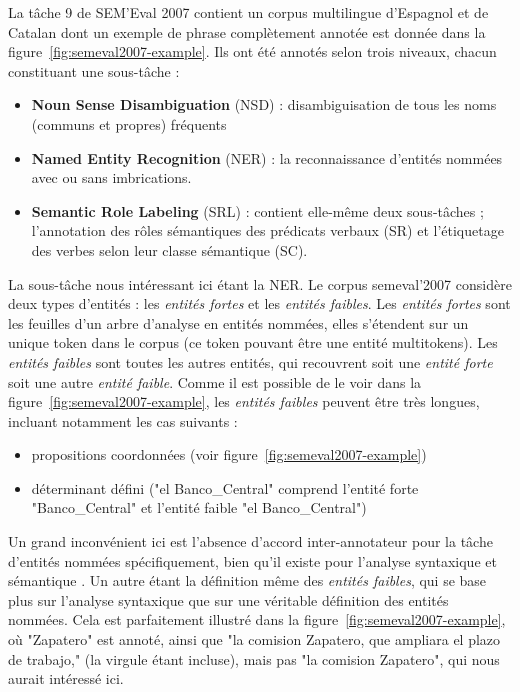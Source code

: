 \documentclass[PhD-Yoann-Dupont.tex]{subfiles}
\begin{document}
La tâche 9 de SEM'Eval 2007 \citep{marquezSemEval2007} contient un corpus multilingue d'Espagnol et de Catalan dont un exemple de phrase complètement annotée est donnée dans la figure\ \ref{fig:semeval2007-example}. Ils ont été annotés selon trois niveaux, chacun constituant une sous-tâche :
\begin{itemize}
    \item \textbf{Noun Sense Disambiguation} (NSD) : disambiguisation de tous les noms (communs et propres) fréquents
    \item \textbf{Named Entity Recognition} (NER) : la reconnaissance d'entités nommées avec ou sans imbrications.
    \item \textbf{Semantic Role Labeling} (SRL) : contient elle-même deux sous-tâches ; l'annotation des rôles sémantiques des prédicats verbaux (SR) et l'étiquetage des verbes selon leur classe sémantique (SC).
\end{itemize}

La sous-tâche nous intéressant ici étant la NER. Le corpus semeval'2007 considère deux types d'entités : les \emph{entités fortes} et les \emph{entités faibles}. Les \emph{entités fortes} sont les feuilles d'un arbre d'analyse en entités nommées, elles s'étendent sur un unique token dans le corpus (ce token pouvant être une entité multitokens). Les \emph{entités faibles} sont toutes les autres entités, qui recouvrent soit une \emph{entité forte} soit une autre \emph{entité faible}. Comme il est possible de le voir dans la figure\ \ref{fig:semeval2007-example}, les \emph{entités faibles} peuvent être très longues, incluant notamment les cas suivants :
\begin{itemize}
    \item propositions coordonnées (voir figure\ \ref{fig:semeval2007-example})
    \item déterminant défini ("el Banco\_Central" comprend l'entité forte "Banco\_Central" et l'entité faible "el Banco\_Central")
\end{itemize}

Un grand inconvénient ici est l'absence d'accord inter-annotateur pour la tâche d'entités nommées spécifiquement, bien qu'il existe pour l'analyse syntaxique \citep{civit2003qualitative} et sémantique \citep{marquez2004quality}. Un autre étant la définition même des \emph{entités faibles}, qui se base plus sur l'analyse syntaxique que sur une véritable définition des entités nommées. Cela est parfaitement illustré dans la figure\ \ref{fig:semeval2007-example}, où "Zapatero" est annoté, ainsi que "la comision Zapatero, que ampliara el plazo de trabajo," (la virgule étant incluse), mais pas "la comision Zapatero", qui nous aurait intéressé ici.
\end{document}
